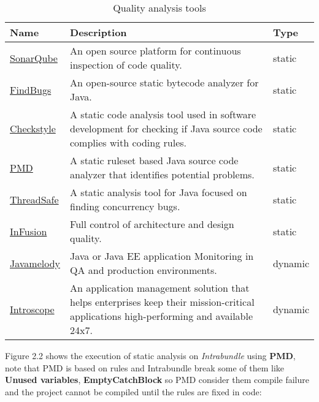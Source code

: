 \begin{table}[h]
\caption{Quality analysis tools}
\begin{center}
    \begin{tabular}{  p{3cm} | p{8cm} | p{2cm} }
    \hline
    Name & Description & Type\\  \hline
    \href{http://www.sonarqube.org}{SonarQube} &  An open source platform for continuous inspection of code quality. & static\\ \hline
    \href{http://findbugs.sourceforge.net/}{FindBugs} & An open-source static bytecode analyzer for Java. & static\\ \hline 
    \href{http://checkstyle.sourceforge.net/}{Checkstyle} & A static code analysis tool used in software development for checking if Java source code complies with coding rules. & static\\ \hline 
    \href{pmd.sourceforge.net/}{PMD} & A static ruleset based Java source code analyzer that identifies potential problems. & static\\ \hline 
    \href{http://www.contemplateltd.com/threadsafe}{ThreadSafe} & A static analysis tool for Java focused on finding concurrency bugs. & static\\ \hline
    \href{http://www.intooitus.com/products/infusion}{InFusion} & Full control of architecture and design quality. & static\\ \hline 
    \href{https://code.google.com/p/javamelody/}{Javamelody} & Java or Java EE application Monitoring in QA and production environments. & dynamic\\ \hline 
    \href{http://www-304.ibm.com/partnerworld/gsd/solutiondetails.do?solution=23517&expand=true}{Introscope} & An application management solution that helps enterprises keep their mission-critical applications high-performing and available 24x7. & dynamic\\ \hline

    \end{tabular}
\end{center}
\end{table}

\FloatBarrier

Figure 2.2 shows the execution of static analysis on \textit{Intrabundle} using \textbf{PMD}, note that PMD is based on rules and Intrabundle break some of them like \textbf{Unused variables}, \textbf{EmptyCatchBlock} so PMD consider them compile failure and the project cannot be compiled until the rules are fixed in code:

